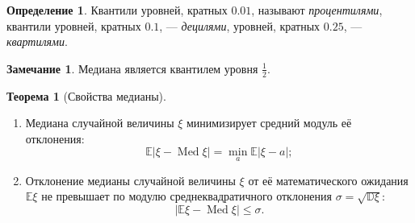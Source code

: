 \documentclass[oneside,final,14pt]{extreport}
\theoremstyle{plain}
\theoremstyle{definition}
\newtheorem*{defn}{Определение}
\newtheorem*{rmrk}{Замечание}
\theoremstyle{named}
\newtheorem*{namedthm}{Теорема}
\begin{document}
\begin{defn}
    Квантили уровней, кратных $0.01$, называют {\it процентилями}, квантили уровней, кратных $0.1$, — {\it децилями}, уровней, кратных $0.25$, — {\it квартилями}.
\end{defn} 

\begin{rmrk}
    Медиана является квантилем уровня $\frac{1}{2}.$
\end{rmrk} 

\begin{namedthm}[Свойства медианы]\leavevmode
\begin{enumerate}
    \item Медиана случайной величины $\xi$ минимизирует средний модуль её отклонения:
    \begin{equation*}
        \mathbb{E}|\xi - \operatorname{Med} \xi| 
    = \min _{a} \mathbb{E}|\xi-a|;
    \end{equation*}
    \item Отклонение медианы случайной величины $\xi$ от её математического ожидания $\mathbb{E}\xi$ не превышает по модулю среднеквадратичного отклонения $\sigma = \sqrt{\mathbb{D}\xi}$:
    \begin{equation*}
        |\mathbb{E}\xi - \operatorname{Med}\xi| \leqslant \sigma.
    \end{equation*}
\end{enumerate}
\end{namedthm}
\end{document}
